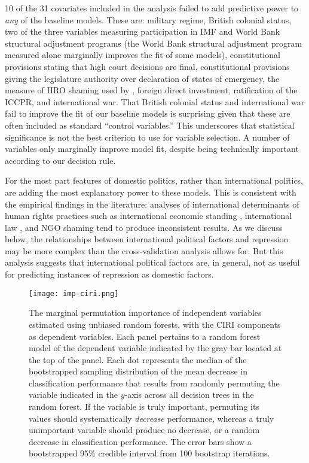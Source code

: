 \documentclass[12pt]{article}
\begin{document}
10 of the 31 covariates included in the analysis failed to add predictive power to {\it any} of the baseline models. These are: military regime, British colonial status, two of the three variables measuring participation in IMF and World Bank structural adjustment programs (the World Bank structural adjustment program measured alone marginally improves the fit of some models), constitutional provisions stating that high court decisions are final, constitutional provisions giving the legislature authority over declaration of states of emergency, the measure of HRO shaming used by \citet{MurdieDavis2012}, foreign direct investment, ratification of the ICCPR, and international war. That British colonial status and international war fail to improve the fit of our baseline models is surprising given that these are often included as standard ``control variables.'' This underscores that statistical significance is not the best criterion to use for variable selection. A number of variables only marginally improve model fit, despite being technically important according to our decision rule.

For the most part features of domestic politics, rather than international politics, are adding the most explanatory power to these models. This is consistent with the empirical findings in the literature: analyses of international determinants of human rights practices such as international economic standing \citep{HafnerBurton2005jpr}, international law \citep{Keith1999,Hathaway2002,Neumayer2005,Simmons2009,PowellStaton2009,Hill2010,ConradRitter2013,Lupu2013}, and NGO shaming \citep{HafnerBurton2008,Franklin2008,MurdieDavis2012} tend to produce inconsistent results. As we discuss below, the relationships between international political factors and repression may be more complex than the cross-validation analysis allows for. But this analysis suggests that international political factors are, in general, not as useful for predicting instances of repression as domestic factors. 

\begin{figure}[!htpb]
\centering
\texttt{[image: imp-ciri.png]}
\caption{The marginal permutation importance of independent variables estimated using unbiased random forests, with the CIRI components as dependent variables. Each panel pertains to a random forest model of the dependent variable indicated by the gray bar located at the top of the panel. Each dot represents the median of the bootstrapped sampling distribution of the mean decrease in classification performance that results from randomly permuting the variable indicated in the $y$-axis across all decision trees in the random forest. If the variable is truly important, permuting its values should systematically \textit{decrease} performance, whereas a truly unimportant variable should produce no decrease, or a random decrease in classification performance. The error bars show a bootstrapped 95\% credible interval from 100 bootstrap iterations.}
\label{fig:imp-ciri}
\end{figure}
\end{document}

